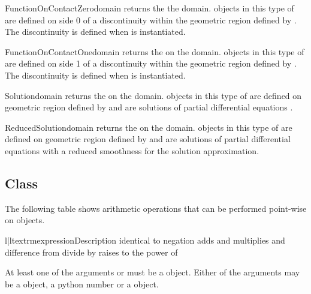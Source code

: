 \begin{funcdesc}{FunctionOnContactZero}{domain}
returns the \FunctionOnContactZero the \Domain domain. \Data objects in this type of \Function
are defined on side 0 of a discontinuity  within the geometric region defined by .
The discontinuity is defined when  is instantiated.
\end{funcdesc}

\begin{funcdesc}{FunctionOnContactOne}{domain}
returns the \FunctionOnContactOne on the \Domain domain. 
\Data objects in this type of \Function
are defined on side 1 of a discontinuity  within the geometric region defined by .
The discontinuity is defined when  is instantiated.
\end{funcdesc}

\begin{funcdesc}{Solution}{domain}
returns the \SolutionFS on the \Domain domain. \Data objects in this type of \Function
are defined on geometric region defined by  and are solutions of
partial differential equations . 
\end{funcdesc}

\begin{funcdesc}{ReducedSolution}{domain}
returns the \ReducedSolutionFS on the \Domain domain. \Data objects in this type of \Function
are defined on geometric region defined by  and are solutions of
partial differential equations  with a reduced smoothness 
for the solution approximation.
\end{funcdesc}

\subsection{\Data Class}
\label{SEC ESCRIPT DATA}

The following table shows arithmetic operations that can be performed point-wise on
\Data objects.
\begin{tableii}{l|l}{textrm}{expression}{Description}
 {identical to  \index{+}}
 {negation\index{-}}
 {adds  and  \index{+}}
 {multiplies  and  \index{*}}
 {difference  from \index{-}}
 {divide  by  \index{/}}
 {raises  to the power of  \index{**}}
\end{tableii}
At least one of the arguments  or  must be a
\Data object.
Either of the arguments may be a \Data object, a python number or a \numpy object.

